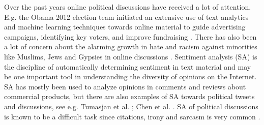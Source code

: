 \documentclass[11pt]{article}
\begin{document}

Over the past years online political discussions have received a lot of attention. E.g. the Obama 2012 election team initiated an extensive use of text analytics and machine learning techniques towards online material to guide advertising campaigns, identifying key voters, and improve fundraising \cite{Issenberg12}. There has also been a lot of concern about the alarming growth in hate and racism against minorities like Muslims, Jews and Gypsies in online discussions \cite{r6,s2}. Sentiment analysis (SA) is the discipline of automatically determining sentiment in text material and may be one important tool in understanding the diversity of opinions on the Internet. SA has mostly been used to analyze opinions in comments and reviews about commercial products, but there are also examples of SA towards political tweets and discussions, see e.g. Tumasjan et al. ; Chen et al. . SA of political discussions is known to be a difficult task since citations, irony and sarcasm is very common \cite{Bing12}.

\end{document}
